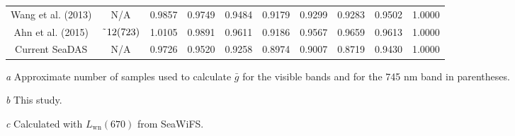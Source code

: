 \documentclass[preview]{standalone}
\begin{document}
\begin{threeparttable}
\begin{tabular}{cccccccccc}
Wang et al. (2013)& 	N/A				& 0.9857 			& 0.9749 			& 0.9484 			& 0.9179 			& 0.9299 & 0.9283 & 0.9502 & 1.0000 \\
Ahn et al. (2015)& 	$\char`\~12(723)$ & 1.0105 & 0.9891 & 0.9611 & 0.9186 & 0.9567 & 0.9659 & 0.9613 & 1.0000 \\
Current SeaDAS 	& N/A	& 0.9726 & 0.9520 & 0.9258 & 0.8974 & 0.9007 & 0.8719 & 0.9430 & 1.0000 \\

\hline 
\end{tabular}
\begin{tablenotes}
\small
\item [\it a] Approximate number of samples used to calculate $\bar{g}$ for the visible bands and for the 745 nm band in parentheses.
\item [\it b] This study.
\item [\it c] Calculated with $L_\text{wn}(670)$ from SeaWiFS.
\end{tablenotes}
\end{threeparttable}
\end{document}

